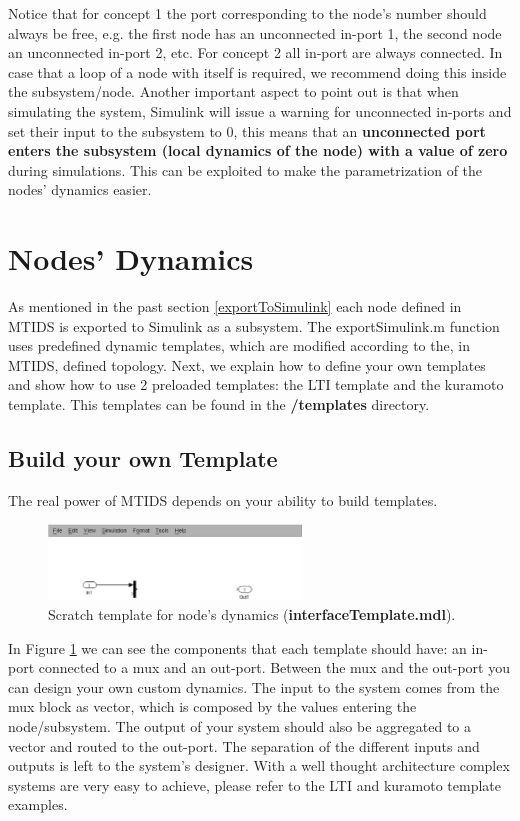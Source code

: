 \documentclass[a4paper,twoside, openright,12pt]{report}
\begin{document}
Notice that for concept 1 the port corresponding to the node's number
should always be free, e.g. the first node has an unconnected in-port 1, the second node an unconnected in-port 2, etc. For concept 2 all in-port are always connected. 
In case that a loop of a node with itself is required, we recommend doing this inside the subsystem/node. 
Another important aspect to point out is that when simulating the system, Simulink will issue a warning for unconnected in-ports and set their input to the subsystem to 0, this means 
that an \textbf{unconnected port enters the subsystem (local dynamics of the node) with a value of zero} during simulations. This can be exploited to 
make the parametrization of the nodes' dynamics easier. 

\section{Nodes' Dynamics}

As mentioned in the past section \ref{exportToSimulink} each node defined in MTIDS is exported to Simulink as a subsystem. The exportSimulink.m function 
uses predefined dynamic templates, which are modified according to the, in MTIDS, defined topology. Next, we explain how to define your own templates and
show how to use 2 preloaded templates: the LTI template and the kuramoto template. This templates can be found in the \textbf{/templates} directory. 


\subsection{Build your own Template} \label{nodeTemplate}
The real power of MTIDS depends on your ability to build templates. 
\\
\begin{figure}[htb]
\centering
\includegraphics[width=0.6\textwidth]{pics/screenBuildTemplate.eps}
\caption[MTIDS node's scratch Template]{Scratch template for node's dynamics (\textbf{interfaceTemplate.mdl}). }
\label{templateFig}
\end{figure}

In Figure \ref{templateFig} we can see the components that each template should have: an in-port connected to a mux and an out-port.
Between the mux and the out-port you can design your own custom dynamics. The input to the system comes from the mux block as vector, which is composed by the values
entering the node/subsystem. The output of your system should also be aggregated to a vector and routed to the out-port. The separation of the different inputs and outputs 
is left to the system's designer. With a well thought architecture complex systems are very easy to achieve, please refer to the LTI and kuramoto template examples.  
\\
\end{document}
